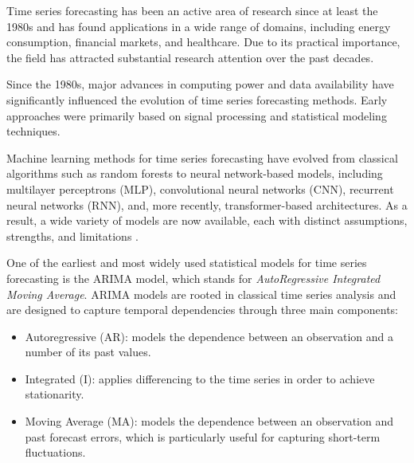 Time series forecasting has been an active area of research since at least the 1980s and has found applications in a wide range of domains, including energy consumption, financial markets, and healthcare. Due to its practical importance, the field has attracted substantial research attention over the past decades.

\par
Since the 1980s, major advances in computing power and data availability have significantly influenced the evolution of time series forecasting methods. Early approaches were primarily based on signal processing and statistical modeling techniques. %

\par
Machine learning methods for time series forecasting have evolved from classical algorithms such as random forests to neural network-based models, including multilayer perceptrons (MLP), convolutional neural networks (CNN), recurrent neural networks (RNN), and, more recently, transformer-based architectures. As a result, a wide variety of models are now available, each with distinct assumptions, strengths, and limitations \cite{De_Gooijer2006-mi, Hahn2023-rc}.


\par
One of the earliest and most widely used statistical models for time series forecasting is the ARIMA model, which stands for \emph{AutoRegressive Integrated Moving Average}. ARIMA models are rooted in classical time series analysis and are designed to capture temporal dependencies through three main components:
\begin{itemize}
    \item Autoregressive (AR): models the dependence between an observation and a number of its past values.
    \item Integrated (I): applies differencing to the time series in order to achieve stationarity.
    \item Moving Average (MA): models the dependence between an observation and past forecast errors, which is particularly useful for capturing short-term fluctuations.
\end{itemize}


